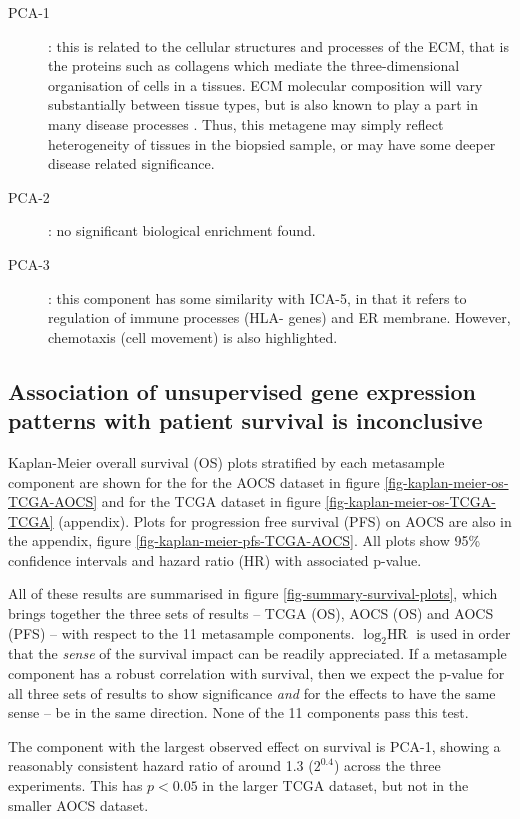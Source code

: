 \documentclass[tikz, 11pt,a4paper,oneside,fleqn]{article}
\begin{document}
\begin{description}
%
\item[PCA-1]: this is related to the cellular structures and processes of the ECM, that is the proteins such as collagens which mediate the three-dimensional organisation of cells in a tissues.  ECM molecular composition will vary substantially between tissue types, but is also known to play a part in many disease processes \cite{Theocharis2019}.  Thus, this metagene may simply reflect heterogeneity of tissues in the biopsied sample, or may have some deeper disease related significance.
%
\item[PCA-2]: no significant biological enrichment found.
%
\item[PCA-3]: this component has some similarity with ICA-5, in that it refers to regulation of immune processes (HLA- genes) and ER membrane.   However, chemotaxis (cell movement) is also highlighted.
\end{description}


\FloatBarrier

\subsection{Association of unsupervised gene expression patterns with patient survival is inconclusive}

Kaplan-Meier overall survival (OS) plots stratified by each metasample component are shown for the for the AOCS dataset in figure \ref{fig-kaplan-meier-os-TCGA-AOCS} and for the TCGA dataset in figure \ref{fig-kaplan-meier-os-TCGA-TCGA} (appendix).  Plots for progression free survival (PFS) on AOCS are also in the appendix, figure \ref{fig-kaplan-meier-pfs-TCGA-AOCS}.   All plots show 95\% confidence intervals and hazard ratio (HR) with associated p-value.

All of these results are summarised in figure \ref{fig-summary-survival-plots}, which brings together the three sets of results -- TCGA (OS), AOCS (OS) and AOCS (PFS) --  with respect to the 11 metasample components.  $\log_2{\mbox{HR}}$ is used in order that the \emph{sense} of the survival impact can be readily appreciated.    If a metasample component has a robust correlation with survival, then we expect the p-value for all three sets of results to show significance \emph{and} for the effects to have the same sense -- be in the same direction.  None of the 11 components pass this test.   

The component with the largest observed effect on survival is PCA-1, showing a reasonably consistent hazard ratio of around 1.3 ($2^{0.4}$) across the three experiments.  This has $p < 0.05$ in the larger TCGA dataset, but not in the smaller AOCS dataset.
\end{document}
